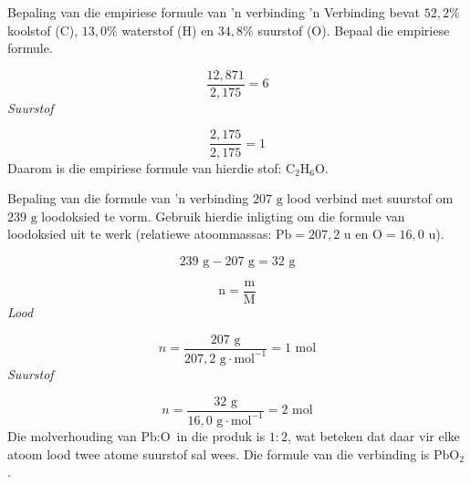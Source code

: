 \begin{wex}{Bepaling van die empiriese formule van 'n verbinding}{
 'n Verbinding bevat $52,2\%$ koolstof ($\text{C}$), $13,0\%$ waterstof ($\text{H}$) en $34,8\%$ suurstof ($\text{O}$). Bepaal die empiriese formule.      
}
{      \label{m38712*id281223}\nopagebreak\noindent{}
        
    \begin{equation*}
    \frac{12,871}{2,175}=6
      \end{equation*}
      \label{m38712*id281254}
        \textsl{Suurstof}
      
      \label{m38712*id281261}\nopagebreak\noindent{}
        
    \begin{equation*}
    \frac{2,175}{2,175}=1
      \end{equation*}
      \label{m38712*id281292}Daarom is die empiriese formule van hierdie stof: ${\text{C}}_{2}{\text{H}}_{6}\text{O}$.
}
    \end{wex}
    \noindent
\label{m38712*secfhsst!!!underscore!!!id1235}
      \noindent
      \begin{wex}{Bepaling van die formule van 'n verbinding}{
$207 \text{ g}$ lood verbind met suurstof om $239 \text{ g}$ loodoksied te vorm. Gebruik hierdie inligting om
    die formule van loodoksied uit te werk (relatiewe atoommassas: $\text{Pb}=207,2 \text{ u}$ en $\text{O} = 16,0 \text{ u}$).
}
{
      \label{m38712*id281379}\nopagebreak\noindent{}
    \begin{equation*}
    239 \text{ g}-207 \text{ g}=32 \text{ g}
      \end{equation*}
      \label{m38712*id281407}\nopagebreak\noindent{}
        
    \begin{equation*}
    \text{n}=\frac{\text{m}}{\text{M}}
      \end{equation*}
      \label{m38712*id281427}
        \textsl{Lood}
       
      \label{m38712*id281433}\nopagebreak\noindent{}
        
    \begin{equation*}
    n = \frac{207 \text{ g}}{207,2 \text{ g} \cdot \text{mol}^{-1}}=1 \text{ mol}
      \end{equation*}
      \label{m38712*id281460}
        \textsl{Suurstof}
    
      \label{m38712*id281467}\nopagebreak\noindent{}
        
    \begin{equation*}
    n= \frac{32 \text{ g}}{16,0 \text{ g} \cdot \text{mol}^{-1}}=2 \text{ mol}
      \end{equation*}
      \label{m38712*id281498}Die molverhouding van $\text{Pb}:\text{O}$ in die produk is $1:2$, wat beteken dat daar vir elke atoom lood twee atome suurstof sal wees. Die formule van die verbinding is $\text{PbO}{}_{2}$. 
}
    \end{wex}
